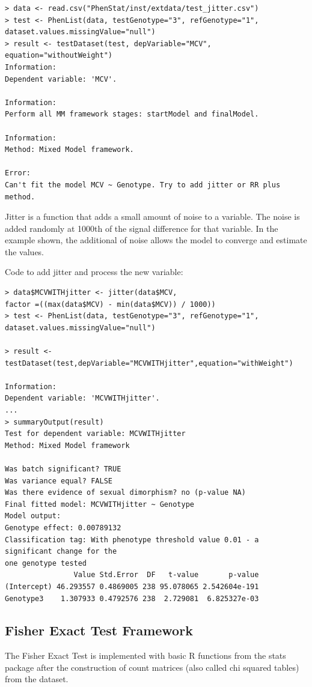 \documentclass[12pt,a4paper]{article}
\begin{document}
\begingroup
    \fontsize{8pt}{12pt}\selectfont
\begin{verbatim}
> data <- read.csv("PhenStat/inst/extdata/test_jitter.csv")
> test <- PhenList(data, testGenotype="3", refGenotype="1", 
dataset.values.missingValue="null")
> result <- testDataset(test, depVariable="MCV", equation="withoutWeight")
Information:
Dependent variable: 'MCV'.

Information:
Perform all MM framework stages: startModel and finalModel.

Information:
Method: Mixed Model framework.

Error:
Can't fit the model MCV ~ Genotype. Try to add jitter or RR plus method.
\end{verbatim}
\endgroup

Jitter is a function that adds a small amount of noise to a variable.  The noise is added randomly at 1000th of the signal difference for that variable.  In the example shown, the additional of noise allows the model to converge and estimate the values.
  
Code to add jitter and process the new variable:
\begingroup
    \fontsize{8pt}{12pt}\selectfont
\begin{verbatim}
> data$MCVWITHjitter <- jitter(data$MCV, 
factor =((max(data$MCV) - min(data$MCV)) / 1000))
> test <- PhenList(data, testGenotype="3", refGenotype="1", 
dataset.values.missingValue="null")

> result <- testDataset(test,depVariable="MCVWITHjitter",equation="withWeight")

Information:
Dependent variable: 'MCVWITHjitter'.
...
> summaryOutput(result)
Test for dependent variable: MCVWITHjitter
Method: Mixed Model framework

Was batch significant? TRUE
Was variance equal? FALSE
Was there evidence of sexual dimorphism? no (p-value NA)
Final fitted model: MCVWITHjitter ~ Genotype
Model output:
Genotype effect: 0.00789132
Classification tag: With phenotype threshold value 0.01 - a significant change for the 
one genotype tested
                Value Std.Error  DF   t-value       p-value
(Intercept) 46.293557 0.4869005 238 95.078065 2.542604e-191
Genotype3    1.307933 0.4792576 238  2.729081  6.825327e-03
\end{verbatim}
\endgroup

 
\subsection{Fisher Exact Test Framework}
\label{section:FET}
The Fisher Exact Test is implemented with basic R functions from the stats package after the construction of count matrices (also called chi squared tables) from the dataset. 
\end{document}
